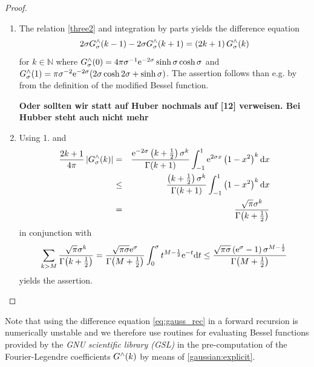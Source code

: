 \documentclass[11pt,a4paper,twoside,bibtotoc]{scrartcl}
\theoremstyle{plain}
\theoremstyle{definition}
\theoremstyle{remark}
\newcommand{\N}{\ensuremath{\mathbb{N}}}
\newcommand{\fun}[2]{\ensuremath{#1{\hspace{-0.4ex}}\left(#2\right)}}
\newcommand{\dx}{\text{\rm{d}}}
\newcommand{\e}{\mbox{\rm{e}}}
\numberwithin{equation}{section}
\numberwithin{table}{section}
\numberwithin{figure}{section}
\begin{document}
\begin{proof}
  ${}^{}$\\[-2ex]
  \begin{enumerate}
  \item The relation \eqref{three2} and integration by parts yields the
    difference equation
    \begin{equation}\label{eq:gauss_rec}
    {2\sigma}\fun{G_{\sigma}^{\wedge}}{k-1} - {2\sigma}\fun{G_{\sigma}^{\wedge}}{k+1} = 
    \left(2k+1\right)\fun{G_{\sigma}^{\wedge}}{k}
    \end{equation}
    for $k\in \N$ where $\fun{G_{\sigma}^{\wedge}}{0} = 4 \pi \sigma^{-1}
    \e^{-2\sigma} \sinh \sigma \cosh \sigma$ and
    $\fun{G_{\sigma}^{\wedge}}{1} = \pi \sigma^{-2} \e^{-2\sigma} (2 \sigma
    \cosh 2 \sigma + \sinh \sigma )$.
    The assertion follows than e.g. by \cite{bahu01} from the
    definition of the modified Bessel function. 

{\bf Oder sollten wir statt auf Huber nochmals auf [12]
    verweisen. Bei Hubber steht auch nicht mehr}

  \item Using 1. and
  \begin{eqnarray*}
    \frac{2k+1}{4\pi} \left|\fun{G_{\sigma}^{\wedge}}{k}\right|
    &=&
    \frac{\e^{-2\sigma}
    \left(k+\frac{1}{2}\right)\sigma^k}{\fun{\Gamma}{k+1}} \int_{-1}^{1}
    \e^{2\sigma x} \left(1-x^2\right)^k \dx x\\
    &\le&
    \frac{\left(k+\frac{1}{2}\right)\sigma^k}{\fun{\Gamma}{k+1}}
    \int_{-1}^{1} \left(1-x^2\right)^k \dx x\\
    &=&
    \frac{\sqrt{\pi}\sigma^k}{\fun{\Gamma}{k+\frac{1}{2}}}
  \end{eqnarray*}
  in conjunction with
  \begin{equation*}
    \sum_{k>M} \frac{\sqrt{\pi}\sigma^k}{\fun{\Gamma}{k+\frac{1}{2}}}\\
    =
    \frac{\sqrt{\pi\sigma}\e^{\sigma}}{\fun{\Gamma}{M+\frac{1}{2}}} 
    \int_{0}^{\sigma} t^{M-\frac{1}{2}} \e^{-t} \dx t\\
    \le
    \frac{\sqrt{\pi\sigma}\left(\e^{\sigma}-1\right)
    \sigma^{M-\frac{1}{2}}}{\fun{\Gamma}{M+\frac{1}{2}}}
  \end{equation*}
  yields the assertion.
\end{enumerate}
\end{proof}

Note that using the difference equation \eqref{eq:gauss_rec} in a forward
recursion is numerically unstable and we therefore use routines for
evaluating Bessel functions provided by
the \emph{GNU scientific library (GSL)} \cite{gsl} in the
pre-computation of the Fourier-Legendre coefficients $\fun{G^{\wedge}}{k}$ 
by means of \eqref{gaussian:explicit}.
\end{document}

